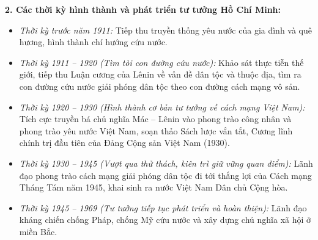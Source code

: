 \documentclass[12pt,a4paper]{article}
\begin{document}
\noindent
\textbf{2. Các thời kỳ hình thành và phát triển tư tưởng Hồ Chí Minh:}
\begin{itemize}
    \item \textit{Thời kỳ trước năm 1911:} Tiếp thu truyền thống yêu nước của gia đình và quê hương, hình thành chí hướng cứu nước.
    \item \textit{Thời kỳ 1911 -- 1920 (Tìm tòi con đường cứu nước):} Khảo sát thực tiễn thế giới, tiếp thu Luận cương của Lênin về vấn đề dân tộc và thuộc địa, tìm ra con đường cứu nước giải phóng dân tộc theo con đường cách mạng vô sản.
    \item \textit{Thời kỳ 1920 -- 1930 (Hình thành cơ bản tư tưởng về cách mạng Việt Nam):} Tích cực truyền bá chủ nghĩa Mác -- Lênin vào phong trào công nhân và phong trào yêu nước Việt Nam, soạn thảo Sách lược vắn tắt, Cương lĩnh chính trị đầu tiên của Đảng Cộng sản Việt Nam (1930).
    \item \textit{Thời kỳ 1930 -- 1945 (Vượt qua thử thách, kiên trì giữ vững quan điểm):} Lãnh đạo phong trào cách mạng giải phóng dân tộc đi tới thắng lợi của Cách mạng Tháng Tám năm 1945, khai sinh ra nước Việt Nam Dân chủ Cộng hòa.
    \item \textit{Thời kỳ 1945 -- 1969 (Tư tưởng tiếp tục phát triển và hoàn thiện):} Lãnh đạo kháng chiến chống Pháp, chống Mỹ cứu nước và xây dựng chủ nghĩa xã hội ở miền Bắc.
\end{itemize}
\end{document}
